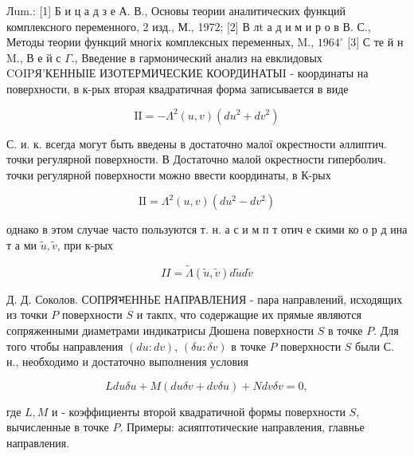 \documentclass[10pt]{article}
\begin{document}
Лum.: [1] Б и ц а д з е А. В., Основы теории аналитических функций комплексного переменного, 2 изд., М., 1972; [2] В лt а д и м и р о в В. С., Методы теории функций многіх комплексных переменных, M., $1964^{\circ}$ [3] С те й н $\mathrm{M}$., В е й с $\Gamma$., Введение в гармонический анализ на евклидовых COIPЯ'КЕННЫІЕ ИЗОТЕРМИЧЕСКИЕ КООРДИНАТЫI - координаты на поверхности, в к-рых вторая квадратичная форма записывается в виде



\[

\mathrm{II}=-\Lambda^{2}(u, v)\left(d u^{2}+d v^{2}\right)

\]



С. и. к. всегда могут быть введены в достаточно малої окрестности әллиптич. точки регулярной поверхности. В Достаточно малой окрестности гиперболич. точки регулярной поверхности можно ввести координаты, в К-рых



\[

\mathrm{II}=\Lambda^{2}(u, v)\left(d u^{2}-d v^{2}\right)

\]



однако в этом случае часто пользуются т. н. а с и м п т отич е скими ко о р д ина т а ми $\tilde{u}, \tilde{v}$, при к-рых



\[

I I=\tilde{\Lambda}(\tilde{u}, \tilde{v}) d \tilde{u} d \tilde{v}

\]



Д. Д. Соколов. СОПРЯभЕННЬЕ НАПРАВЛЕНИЯ - пара направлений, исходящих из точки $P$ поверхности $S$ и такпх, что содержащие их прямые являются сопряженными диаметрами индикатрисы Дюшена поверхности $S$ в точке $P$. Для того чтобы направления $(d u: d v)$, $(\delta u: \delta v)$ в точке $P$ поверхности $S$ были С. н., необходимо и достаточно выполнения условия



\[

L d u \delta u+M(d u \delta v+d v \delta u)+N d v \delta v=0,

\]



где $L, M$ и - коэффициенты второй квадратичной формы поверхности $S$, вычисленные в точке $P$. Примеры: асияптотические направления, главнье направления.
\end{document}
